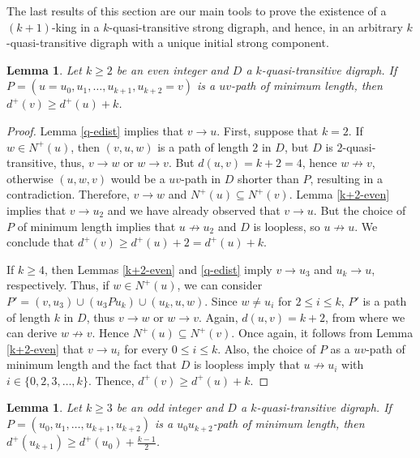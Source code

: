 \documentclass[preprint]{elsarticle}
\newtheorem{lem}[thm]{Lemma}
\begin{document}
The last results of this section are our main tools to prove the existence of a $(k+1)$-king in a $k$-quasi-transitive strong digraph, and hence, in an arbitrary $k$-quasi-transitive digraph with a unique initial strong component.


\begin{lem} \label{deg-even}
Let $k \ge 2$ be an even integer and $D$ a $k$-quasi-transitive digraph.   If $P = (u = u_0, u_1, \dots, u_{k+1}, u_{k+2} = v)$ is a $u v$-path of minimum length, then $d^+(v) \ge d^+(u) + k$.
\end{lem}

\begin{proof}
Lemma \ref{q-edist} implies that $v \to u$.   First, suppose that $k = 2$.   If $w \in N^+ (u)$, then $(v,u,w)$ is a path of length $2$ in $D$, but $D$ is $2$-quasi-transitive, thus, $v \to w$ or $w \to v$.   But $d(u,v) = k+2 = 4$, hence $w \not \to v$, otherwise $(u, w, v)$ would be a $uv$-path in $D$ shorter than $P$, resulting in a contradiction.   Therefore, $v \to w$ and $N^+(u) \subseteq N^+(v)$.   Lemma \ref{k+2-even} implies that $v \to u_2$ and we have already observed that $v \to u$.   But the choice of $P$ of minimum length implies that $u \not \to u_2$ and $D$ is loopless, so $u \not \to u$.   We conclude that $d^+(v) \ge d^+(u) + 2 = d^+(u) + k$.

If $k \ge 4$, then Lemmas \ref{k+2-even} and \ref{q-edist} imply $v \to u_3$ and $u_k \to u$, respectively.   Thus, if $w \in N^+(u)$, we can consider $P' = (v, u_3) \cup (u_3 P u_k) \cup (u_k, u, w)$.   Since $w \ne u_i$ for $2 \le i \le k$, $P'$ is a path of length $k$ in $D$, thus $v \to w$ or $w \to v$.   Again, $d(u,v) = k+2$, from where we can derive $w \not \to v$.   Hence $N^+ (u) \subseteq N^+ (v)$.   Once again, it follows from Lemma \ref{k+2-even} that $v \to u_i$ for every $0 \le i \le k$.   Also, the choice of $P$ as a $uv$-path of minimum length and the fact that $D$ is loopless imply that $u \not \to u_i$ with $i \in \{ 0, 2, 3, \dots, k \}$.   Thence, $d^+(v) \ge d^+(u) + k$.
\end{proof}


\begin{lem} \label{deg-odd}
Let $k \ge 3$ be an odd integer and $D$ a $k$-quasi-transitive digraph.   If $P = (u_0, u_1, \dots, u_{k+1}, u_{k+2})$ is a $u_0 u_{k+2}$-path of minimum length, then $d^+(u_{k+1}) \ge d^+(u_0) + \frac{k-1}{2}$.
\end{lem}
\end{document}

